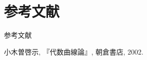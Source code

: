 \documentclass[dvipdfmx,12pt,aspectratio=169]{beamer}%
\begin{document}

\section{参考文献}

\begin{frame}[allowframebreaks]{参考文献}
    \begin{thebibliography}{Og02}\beamertemplatetextbibitems
         小木曽啓示, 
        『代数曲線論』, 朝倉書店, 2002.
    \end{thebibliography}
\end{frame}
\end{document}
